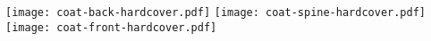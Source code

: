 \documentclass[border=0pt]{standalone}
\begin{document}
%
\noindent%
  \texttt{[image: coat-back-hardcover.pdf]}%
  \texttt{[image: coat-spine-hardcover.pdf]}%
  \texttt{[image: coat-front-hardcover.pdf]}%
\end{document}
